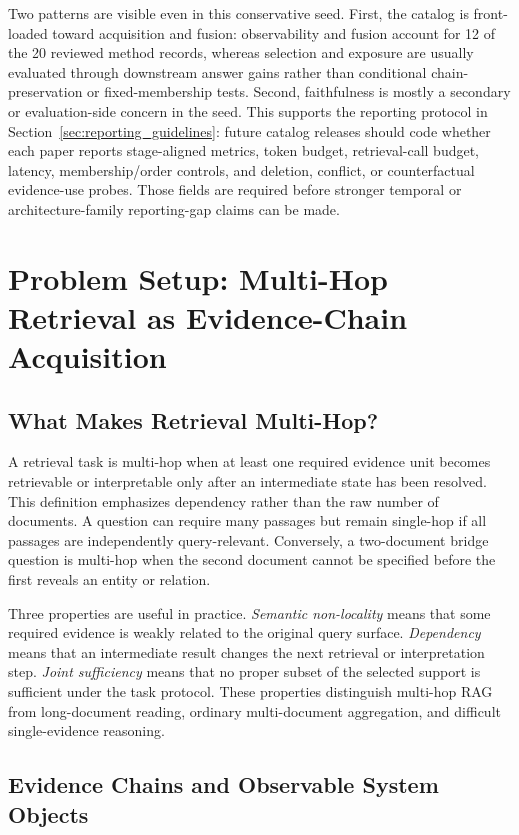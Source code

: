 \documentclass[manuscript,review]{acmart}
\theoremstyle{definition}
\theoremstyle{plain}
\theoremstyle{remark}
\begin{document}
Two patterns are visible even in this conservative seed. First, the catalog is
front-loaded toward acquisition and fusion: observability and fusion account
for 12 of the 20 reviewed method records, whereas selection and exposure are
usually evaluated through downstream answer gains rather than conditional
chain-preservation or fixed-membership tests. Second, faithfulness is mostly
a secondary or evaluation-side concern in the seed. This supports the
reporting protocol in Section~\ref{sec:reporting_guidelines}: future catalog
releases should code whether each paper reports stage-aligned metrics, token
budget, retrieval-call budget, latency, membership/order controls, and
deletion, conflict, or counterfactual evidence-use probes. Those fields are
required before stronger temporal or architecture-family reporting-gap claims
can be made.
\section{Problem Setup: Multi-Hop Retrieval as Evidence-Chain Acquisition}
\label{sec:problem_setup}

\subsection{What Makes Retrieval Multi-Hop?}
\label{subsec:what_is_mh}

A retrieval task is multi-hop when at least one required evidence unit becomes
retrievable or interpretable only after an intermediate state has been
resolved. This definition emphasizes dependency rather than the raw number of
documents. A question can require many passages but remain single-hop if all
passages are independently query-relevant. Conversely, a two-document bridge
question is multi-hop when the second document cannot be specified before the
first reveals an entity or relation.

Three properties are useful in practice. \emph{Semantic non-locality} means
that some required evidence is weakly related to the original query surface.
\emph{Dependency} means that an intermediate result changes the next
retrieval or interpretation step. \emph{Joint sufficiency} means that no
proper subset of the selected support is sufficient under the task protocol.
These properties distinguish multi-hop RAG from long-document reading,
ordinary multi-document aggregation, and difficult single-evidence reasoning.

\subsection{Evidence Chains and Observable System Objects}
\label{subsec:latent_chain}
\end{document}
